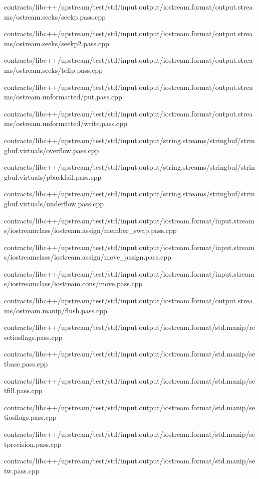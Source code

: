 \begin{DoxyCompactItemize}
contracts/libc++/upstream/test/std/input.\+output/iostream.\+format/output.\+streams/ostream.\+seeks/seekp.\+pass.\+cpp\item 
contracts/libc++/upstream/test/std/input.\+output/iostream.\+format/output.\+streams/ostream.\+seeks/seekp2.\+pass.\+cpp\item 
contracts/libc++/upstream/test/std/input.\+output/iostream.\+format/output.\+streams/ostream.\+seeks/tellp.\+pass.\+cpp\item 
contracts/libc++/upstream/test/std/input.\+output/iostream.\+format/output.\+streams/ostream.\+unformatted/put.\+pass.\+cpp\item 
contracts/libc++/upstream/test/std/input.\+output/iostream.\+format/output.\+streams/ostream.\+unformatted/write.\+pass.\+cpp\item 
contracts/libc++/upstream/test/std/input.\+output/string.\+streams/stringbuf/stringbuf.\+virtuals/overflow.\+pass.\+cpp\item 
contracts/libc++/upstream/test/std/input.\+output/string.\+streams/stringbuf/stringbuf.\+virtuals/pbackfail.\+pass.\+cpp\item 
contracts/libc++/upstream/test/std/input.\+output/string.\+streams/stringbuf/stringbuf.\+virtuals/underflow.\+pass.\+cpp\item 
contracts/libc++/upstream/test/std/input.\+output/iostream.\+format/input.\+streams/iostreamclass/iostream.\+assign/member\+\_\+swap.\+pass.\+cpp\item 
contracts/libc++/upstream/test/std/input.\+output/iostream.\+format/input.\+streams/iostreamclass/iostream.\+assign/move\+\_\+assign.\+pass.\+cpp\item 
contracts/libc++/upstream/test/std/input.\+output/iostream.\+format/input.\+streams/iostreamclass/iostream.\+cons/move.\+pass.\+cpp\item 
contracts/libc++/upstream/test/std/input.\+output/iostream.\+format/output.\+streams/ostream.\+manip/flush.\+pass.\+cpp\item 
contracts/libc++/upstream/test/std/input.\+output/iostream.\+format/std.\+manip/resetiosflags.\+pass.\+cpp\item 
contracts/libc++/upstream/test/std/input.\+output/iostream.\+format/std.\+manip/setbase.\+pass.\+cpp\item 
contracts/libc++/upstream/test/std/input.\+output/iostream.\+format/std.\+manip/setfill.\+pass.\+cpp\item 
contracts/libc++/upstream/test/std/input.\+output/iostream.\+format/std.\+manip/setiosflags.\+pass.\+cpp\item 
contracts/libc++/upstream/test/std/input.\+output/iostream.\+format/std.\+manip/setprecision.\+pass.\+cpp\item 
contracts/libc++/upstream/test/std/input.\+output/iostream.\+format/std.\+manip/setw.\+pass.\+cpp\end{DoxyCompactItemize}
